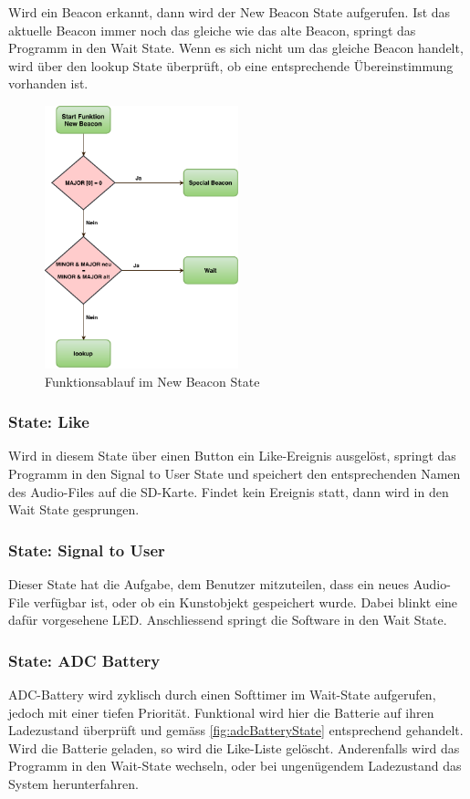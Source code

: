 Wird ein Beacon erkannt, dann wird der New Beacon State aufgerufen. Ist das aktuelle Beacon immer noch das gleiche wie das alte Beacon, springt das Programm in den Wait State. Wenn es sich nicht um das gleiche Beacon handelt, wird über den lookup State überprüft, ob eine entsprechende Übereinstimmung vorhanden ist.

\begin{figure}[htbp!!!!]
	\centering
	\includegraphics[width=0.5\textwidth]{Data/NewBeacon_picture.pdf}
	\caption[Statemachine: New Beacon]{Funktionsablauf im New Beacon State}
	\label{fig:newBeaconState}
\end{figure} 

\subsubsection*{State: Like}

Wird in diesem State über einen Button ein Like-Ereignis ausgelöst, springt das Programm in den Signal to User State und speichert den entsprechenden Namen des Audio-Files auf die SD-Karte. Findet kein Ereignis statt, dann wird in den Wait State gesprungen.

\subsubsection*{State: Signal to User}

Dieser State hat die Aufgabe, dem Benutzer mitzuteilen, dass ein neues Audio-File verfügbar ist, oder ob ein Kunstobjekt gespeichert wurde. Dabei blinkt eine dafür vorgesehene LED. Anschliessend springt die Software in den Wait State.

\subsubsection*{State: ADC Battery}
ADC-Battery wird zyklisch durch einen Softtimer im Wait-State aufgerufen, jedoch mit einer tiefen Priorität. Funktional wird hier die Batterie auf ihren Ladezustand überprüft und gemäss \ref{fig:adcBatteryState} entsprechend gehandelt. Wird die Batterie geladen, so wird die Like-Liste gelöscht. Anderenfalls wird das Programm in den Wait-State wechseln, oder bei ungenügendem Ladezustand das System herunterfahren.

